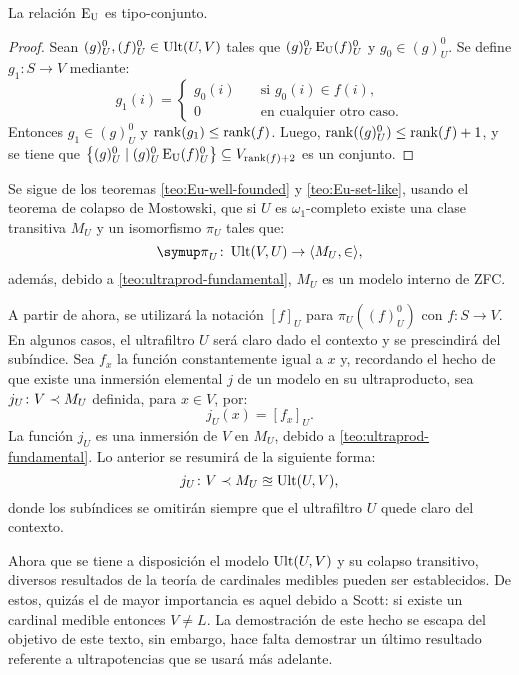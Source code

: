\begin{teo}\label{teo:Eu-set-like}
    La relación $\operatorname{E_U}$ es tipo-conjunto.
\end{teo}
\begin{proof}
    \def\Ou{^0_U}
    Sean $(g)\Ou, (f)\Ou\in \Ult(U,V)$ tales que $(g)\Ou \Eu (f)\Ou$ y $g_0\in(g)\Ou$.
    Se define $g_1\colon S\to V$ mediante:
    \[
        g_1(i) =
        \begin{cases}
          g_0(i)\quad & \text{si $g_0(i)\in f(i)$,}\\
          0\quad & \text{en cualquier otro caso.}
        \end{cases}
    \]
    Entonces $g_1\in (g)\Ou$ y $\operatorname{rank}(g_1)\leq\operatorname{rank}(f)$. Luego, $\rank((g)\Ou)\leq\rank(f)+1$,
    y se tiene que $\set{(g)\Ou\mid (g)\Ou\Eu (f)\Ou}\subseteq V_{\rank(f)+2}$ es un conjunto.
\end{proof}

Se sigue de los teoremas \ref{teo:Eu-well-founded} y \ref{teo:Eu-set-like},
usando el teorema de colapso de Mostowski, que si $U$ es $\omega_1$-completo
existe una clase transitiva $M_U$ y un isomorfismo $\pi_U$ tales que:
\[
    \pi_U\colon\Ult(V,U)\to\op{M_U,\in},
\]
además, debido a \ref{teo:ultraprod-fundamental}, $M_U$ es un modelo interno
de ZFC.

A partir de ahora, se utilizará la notación $[f]_U$ para $\pi_U((f)_U^0)$
con $f\colon S\to V$. En algunos casos, el ultrafiltro $U$ será claro dado el contexto
y se prescindirá del subíndice. Sea $f_x$ la función constantemente igual a $x$ y,
recordando el hecho de que existe una inmersión elemental $j$ de un modelo en su ultraproducto,
sea $j_U\colon V\prec M_U$ definida, para $x\in V$, por:
\[
    j_U(x) = [f_x]_U.
\]
La función $j_U$ es una inmersión de $V$ en $M_U$, debido a \ref{teo:ultraprod-fundamental}.
Lo anterior se resumirá de la siguiente forma:
\[
    j_U\colon V\prec M_U\approxeq\operatorname{Ult}(U,V),
\]
donde los subíndices se omitirán siempre que el ultrafiltro $U$ quede claro
del contexto.

Ahora que se tiene a disposición el modelo $\operatorname{Ult}(U,V)$ y su colapso transitivo,
diversos resultados de la teoría de cardinales medibles pueden ser establecidos.
De estos, quizás el de mayor importancia es aquel debido a Scott: si existe
un cardinal medible entonces $V\neq L$. La demostración de este hecho se
escapa del objetivo de este texto, sin embargo, hace falta demostrar un
último resultado referente a ultrapotencias que se usará más adelante.

